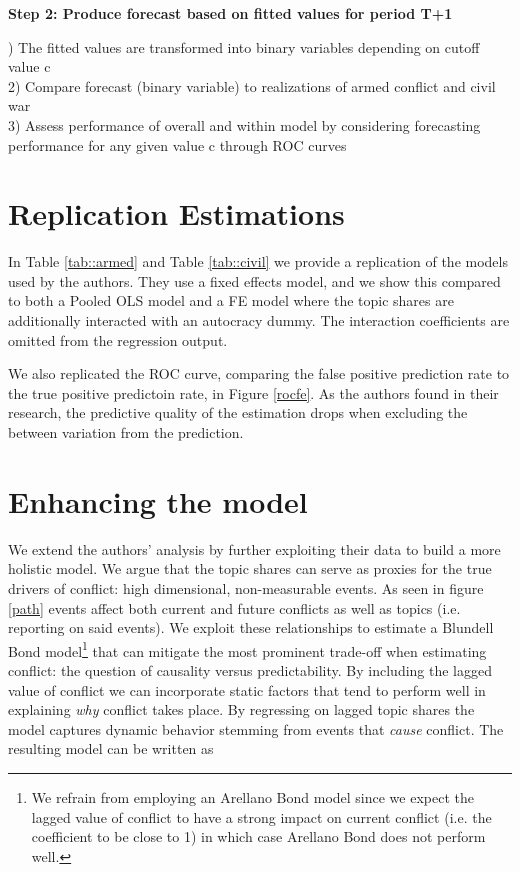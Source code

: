 \noindent \textbf{Step 2: Produce forecast based on fitted values for period T+1}

) The fitted values are transformed into binary variables depending on cutoff value c\\
2) Compare forecast (binary variable) to realizations of armed conflict and civil war\\
3) Assess performance of overall and within model by considering forecasting performance for any given value c through ROC curves

\section{Replication Estimations}
In Table \ref{tab::armed} and Table \ref{tab::civil} we provide a replication of the models used by the authors.
They use a fixed effects model, and we show this compared to both a Pooled OLS model and a FE model where the topic shares are additionally interacted with an autocracy dummy. The interaction coefficients are omitted from the regression output.

We also replicated the ROC curve, comparing the false positive prediction rate to the true positive predictoin rate, in Figure \ref{rocfe}.
As the authors found in their research, the predictive quality of the estimation drops when excluding the between variation from the prediction.

\section{Enhancing the model}
We extend the authors' analysis by further exploiting their data to build a more holistic model.
We argue that the topic shares can serve as proxies for the true drivers of conflict: high dimensional, non-measurable events.
As seen in figure \ref{path} events affect both current and future conflicts as well as topics (i.e. reporting on said events).
We exploit these relationships to estimate a Blundell Bond model\footnote{We refrain from employing an Arellano Bond model since we expect the lagged value of conflict to have a strong impact on current conflict (i.e. the coefficient to be close to 1) in which case Arellano Bond does not perform well.} that can mitigate the most prominent trade-off when estimating conflict: the question of causality versus predictability.
By including the lagged value of conflict we can incorporate static factors that tend to perform well in explaining \textit{why} conflict takes place.
By regressing on lagged topic shares the model captures dynamic behavior stemming from events that \textit{cause} conflict.
The resulting model can be written as

